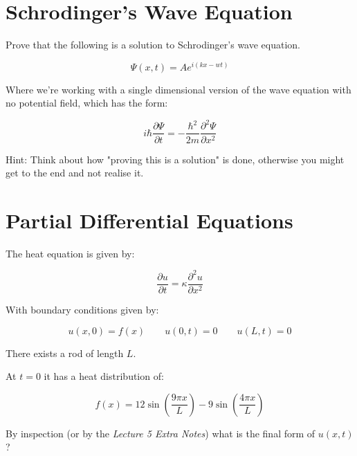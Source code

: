 \documentclass{article}
\begin{document}
\clearpage
\section{Schrodinger's Wave Equation}

Prove that the following is a solution to Schrodinger's wave equation. 

\begin{equation}
  \Psi(x,t) = A e^{i(kx-wt)}
\end{equation}

Where we're working with a single dimensional version of the wave equation with 
no potential field, which has the form: 

\begin{equation}
  i \hbar \frac{\partial \Psi}{\partial t} = -\frac{\hbar^2}{2m} 
  \frac{\partial^2 \Psi}{\partial x^2} 
\end{equation}

\vspace{1cm}
Hint: Think about how "proving this is a solution" is done, otherwise you might 
get to the end and not realise it.

\clearpage
\section{Partial Differential Equations}

The heat equation is given by:

\begin{equation}
  \frac{\partial u }{\partial t} = \kappa \frac{\partial^{2}u}{\partial x^{2}}
\end{equation}

With boundary conditions given by:

\begin{equation}
  u(x,0) = f(x) \qquad u(0,t) = 0 \qquad u(L,t) = 0
\end{equation}

There exists a rod of length $L$.

At $t=0$ it has a heat distribution of:

\begin{equation}
  f(x) = 12 \sin\left( \frac{9 \pi x}{L} \right) - 
  9 \sin\left( \frac{4 \pi x}{L} \right)
\end{equation}

By inspection (or by the \textit{Lecture 5 Extra Notes}) what is the 
final form of $u(x,t)$?
\end{document}
